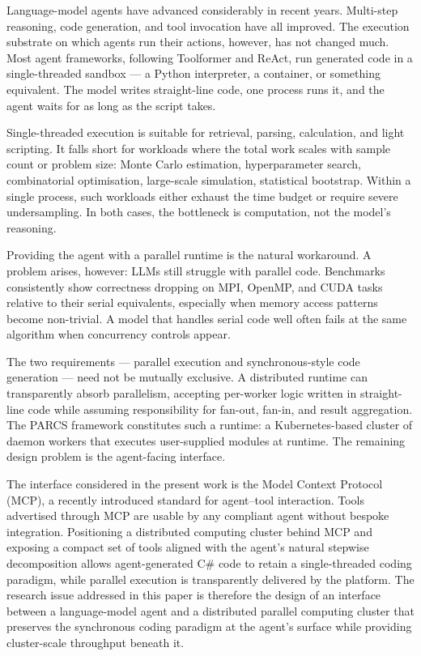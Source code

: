 

Language-model agents have advanced considerably in recent years. Multi-step reasoning, code generation, and tool invocation have all improved. The execution substrate on which agents run their actions, however, has not changed much. Most agent frameworks, following Toolformer and ReAct, run generated code in a single-threaded sandbox --- a Python interpreter, a container, or something equivalent. The model writes straight-line code, one process runs it, and the agent waits for as long as the script takes.

Single-threaded execution is suitable for retrieval, parsing, calculation, and light scripting. It falls short for workloads where the total work scales with sample count or problem size: Monte Carlo estimation, hyperparameter search, combinatorial optimisation, large-scale simulation, statistical bootstrap. Within a single process, such workloads either exhaust the time budget or require severe undersampling. In both cases, the bottleneck is computation, not the model's reasoning.

Providing the agent with a parallel runtime is the natural workaround. A problem arises, however: LLMs still struggle with parallel code. Benchmarks consistently show correctness dropping on MPI, OpenMP, and CUDA tasks relative to their serial equivalents, especially when memory access patterns become non-trivial. A model that handles serial code well often fails at the same algorithm when concurrency controls appear.

The two requirements --- parallel execution and synchronous-style code generation --- need not be mutually exclusive. A distributed runtime can transparently absorb parallelism, accepting per-worker logic written in straight-line code while assuming responsibility for fan-out, fan-in, and result aggregation. The PARCS framework constitutes such a runtime: a Kubernetes-based cluster of daemon workers that executes user-supplied modules at runtime. The remaining design problem is the agent-facing interface.

The interface considered in the present work is the Model Context Protocol (MCP), a recently introduced standard for agent--tool interaction. Tools advertised through MCP are usable by any compliant agent without bespoke integration. Positioning a distributed computing cluster behind MCP and exposing a compact set of tools aligned with the agent's natural stepwise decomposition allows agent-generated C\# code to retain a single-threaded coding paradigm, while parallel execution is transparently delivered by the platform. The research issue addressed in this paper is therefore the design of an interface between a language-model agent and a distributed parallel computing cluster that preserves the synchronous coding paradigm at the agent's surface while providing cluster-scale throughput beneath it.
